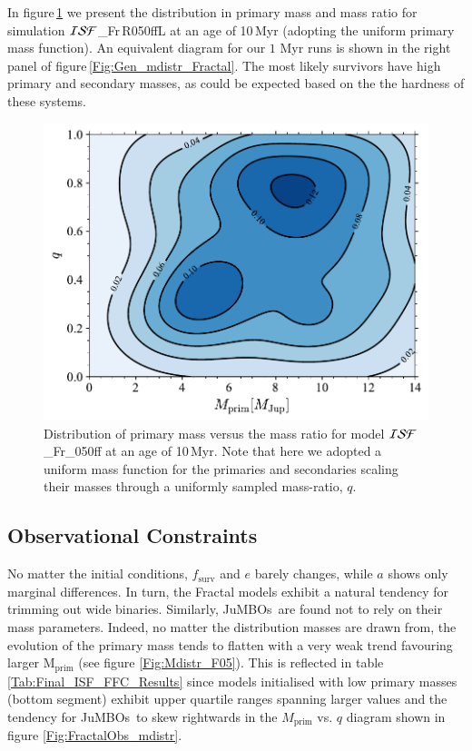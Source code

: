 \documentclass[submission,phys]{lib/SciPost}
\newcommand{\jumbos}{\mbox{JuMBOs}}
\begin{document}
In figure\,\ref{Fig:SimTime_MPrimQ} we present the distribution in
primary mass and mass ratio for simulation ${\cal ISF}$\_Fr\,R050ffL
at an age of 10\,Myr (adopting the uniform primary mass function). An
equivalent diagram for our $1$ Myr runs is shown in the right panel of
figure\,\ref{Fig:Gen_mdistr_Fractal}.  The most likely survivors have
high primary and secondary masses, as could be expected based on the
the hardness of these systems.


\begin{figure}
    \centering
    \includegraphics[width=0.75\columnwidth]{figures/Fractal_rvir0.5_FF_10Myr_mass_distr.pdf}
    \caption{Distribution of primary mass versus the mass ratio for
      model ${\cal ISF}$\_Fr\_050ff at an age of 10\,Myr.  Note that
      here we adopted a uniform mass function
      for the primaries and secondaries scaling their masses through a uniformly sampled
      mass-ratio, $q$.}
         \label{Fig:SimTime_MPrimQ}
\end{figure}

\subsection{Observational Constraints}

No matter the initial conditions, $f_{\mathrm{surv}}$ and $e$ barely
changes, while $a$ shows only marginal differences.  In turn, the
Fractal models exhibit a natural tendency for trimming out wide
binaries. Similarly, \jumbos\ are found not to rely on their mass
parameters. Indeed, no matter the distribution masses are drawn from,
the evolution of the primary mass tends to flatten with a very weak
trend favouring larger $\mathrm{M_{\mathrm{prim}}}$ (see figure
\ref{Fig:Mdistr_F05}). This is reflected in table
\ref{Tab:Final_ISF_FFC_Results} since models initialised with low
primary masses (bottom segment) exhibit upper quartile ranges spanning
larger values and the tendency for \jumbos\ to skew rightwards in the
$M_{\mathrm{prim}}$ vs. $q$ diagram shown in figure
\ref{Fig:FractalObs_mdistr}.
\end{document}
